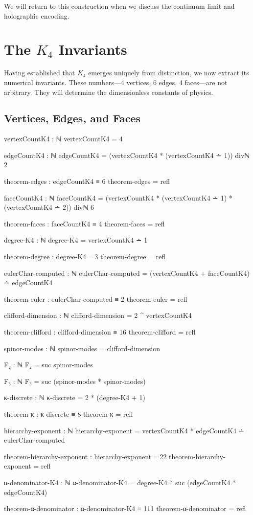 \documentclass[11pt,a4paper]{book}
\begin{document}
We will return to this construction when we discuss the continuum limit and 
holographic encoding.

\chapter[The K4 Invariants]{The $K_4$ Invariants}
\label{chap:k4-invariants}

Having established that $K_4$ emerges uniquely from distinction, we now extract its 
numerical invariants. These numbers—4 vertices, 6 edges, 4 faces—are not arbitrary. 
They will determine the dimensionless constants of physics.

\section{Vertices, Edges, and Faces}

\begin{code}
vertexCountK4 : ℕ
vertexCountK4 = 4

edgeCountK4 : ℕ
edgeCountK4 = (vertexCountK4 * (vertexCountK4 ∸ 1)) divℕ 2

theorem-edges : edgeCountK4 ≡ 6
theorem-edges = refl

faceCountK4 : ℕ
faceCountK4 = (vertexCountK4 * (vertexCountK4 ∸ 1) * (vertexCountK4 ∸ 2)) divℕ 6

theorem-faces : faceCountK4 ≡ 4
theorem-faces = refl

degree-K4 : ℕ
degree-K4 = vertexCountK4 ∸ 1

theorem-degree : degree-K4 ≡ 3
theorem-degree = refl

eulerChar-computed : ℕ
eulerChar-computed = (vertexCountK4 + faceCountK4) ∸ edgeCountK4

theorem-euler : eulerChar-computed ≡ 2
theorem-euler = refl

clifford-dimension : ℕ
clifford-dimension = 2 ^ vertexCountK4

theorem-clifford : clifford-dimension ≡ 16
theorem-clifford = refl

spinor-modes : ℕ
spinor-modes = clifford-dimension

F₂ : ℕ
F₂ = suc spinor-modes

F₃ : ℕ
F₃ = suc (spinor-modes * spinor-modes)

κ-discrete : ℕ
κ-discrete = 2 * (degree-K4 + 1)

theorem-κ : κ-discrete ≡ 8
theorem-κ = refl

hierarchy-exponent : ℕ
hierarchy-exponent = vertexCountK4 * edgeCountK4 ∸ eulerChar-computed

theorem-hierarchy-exponent : hierarchy-exponent ≡ 22
theorem-hierarchy-exponent = refl

α-denominator-K4 : ℕ
α-denominator-K4 = degree-K4 * suc (edgeCountK4 * edgeCountK4)

theorem-α-denominator : α-denominator-K4 ≡ 111
theorem-α-denominator = refl
\end{code}
\end{document}
